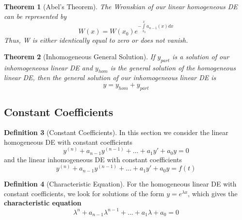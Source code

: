 \documentclass[12pt]{article}
\newtheorem{thm}{Theorem}[section]
\theoremstyle{definition}
\newtheorem{defn}[thm]{Definition}
\theoremstyle{remark}
\numberwithin{equation}{section}
\newcommand\B[1]{\textbf{ #1}}
\begin{document}
\vspace{1cm}


\begin{thm}[Abel's Theorem]
        The Wronskian of our linear homogeneous DE can be represented by \begin{equation}
                W(x) = W(x_0)e^{-\int\limits_{x_0}^xa_{n-1}(x)dx}
        \end{equation}
        Thus, W is either identically equal to zero or does not vanish.
\end{thm}


\vspace{1cm}


\begin{thm}[Inhomogeneous General Solution]
        If $y_{part}$ is a solution of our inhomogeneous linear DE and $y_{hom}$ is the general solution of the homogeneous linear DE, then the general solution of our inhomogeneous linear DE is \begin{equation}
                y = y_{hom} + y_{part}
        \end{equation}
\end{thm}


\vspace{1cm}


\subsection{Constant Coefficients}


\begin{defn}[Constant Coefficients]
        In this section we consider the linear homogeneous DE with constant coefficients \begin{equation}
                y^{(n)}+a_{n-1}y^{(n-1)}+\hdots+a_1y'+a_0y = 0
        \end{equation}
        and the linear inhomogeneous DE with constant coefficients \begin{equation}
                y^{(n)}+a_{n-1}y^{(n-1)}+\hdots+a_1y'+a_0y = f(t)
        \end{equation}
\end{defn}


\vspace{1cm}


\begin{defn}[Characteristic Equation]
        For the homogeneous linear DE with constant coefficients, we look for solutions of the form $y = e^{\lambda x}$, which gives the \B{characteristic equation} \begin{equation}
                \lambda^n+a_{n-1}\lambda^{n-1}+...+a_1\lambda+a_0 = 0
        \end{equation}
\end{defn}
\end{document}
